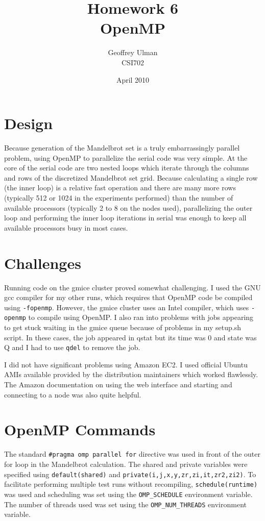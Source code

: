 \documentclass{article}
\begin{document}
\title{Homework 6\\
       OpenMP}
\author{Geoffrey Ulman\\
        CSI702}
\date{April 2010}
\maketitle

\section{Design}
Because generation of the Mandelbrot set is a truly embarrassingly parallel problem, using OpenMP to parallelize the serial code was very simple. At the core of the serial code are two nested loops which iterate through the columns and rows of the discretized Mandelbrot set grid. Because calculating a single row (the inner loop) is a relative fast operation and there are many more rows (typically 512 or 1024 in the experiments performed) than the number of available processors (typically 2 to 8 on the nodes used), parallelizing the outer loop and performing the inner loop iterations in serial was enough to keep all available processors busy in most cases.

\section{Challenges}
Running code on the gmice cluster proved somewhat challenging. I used the GNU gcc compiler for my other runs, which requires that OpenMP code be compiled using \verb!-fopenmp!. However, the gmice cluster uses an Intel compiler, which uses \verb!-openmp! to compile using OpenMP. I also ran into problems with jobs appearing to get stuck waiting in the gmice queue because of problems in my setup.sh script. In these cases, the job appeared in qstat but its time was 0 and state was Q and I had to use \verb!qdel! to remove the job.

I did not have significant problems using Amazon EC2. I used official Ubuntu AMIs available provided by the distribution maintainers which worked flawlessly. The Amazon documentation on using the web interface and starting and connecting to a node was also quite helpful.

\section{OpenMP Commands}
The standard \verb!#pragma omp parallel for! directive was used in front of the outer for loop in the Mandelbrot calculation. The shared and private variables were specified using \verb!default(shared)! and \verb!private(i,j,x,y,zr,zi,it,zr2,zi2)!. To facilitate performing multiple test runs without recompiling, \verb!schedule(runtime)! was used and scheduling was set using the \verb!OMP_SCHEDULE! environment variable. The number of threads used was set using the \verb!OMP_NUM_THREADS! environment variable.
\end{document}
